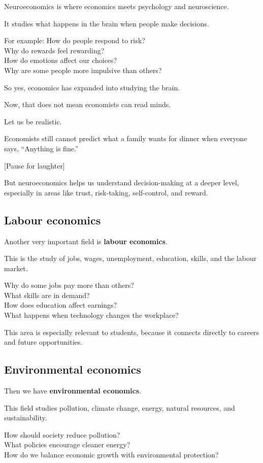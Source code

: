 \documentclass[12pt]{article}
\begin{document}
Neuroeconomics is where economics meets psychology and neuroscience.

It studies what happens in the brain when people make decisions.

For example:
How do people respond to risk?\\
Why do rewards feel rewarding?\\
How do emotions affect our choices?\\
Why are some people more impulsive than others?

So yes, economics has expanded into studying the brain.

Now, that does not mean economists can read minds.

Let us be realistic.

Economists still cannot predict what a family wants for dinner when everyone says, “Anything is fine.”

[Pause for laughter]

But neuroeconomics helps us understand decision-making at a deeper level, especially in areas like trust, risk-taking, self-control, and reward.

\subsection*{Labour economics}

Another very important field is \textbf{labour economics}.

This is the study of jobs, wages, unemployment, education, skills, and the labour market.

Why do some jobs pay more than others?\\
What skills are in demand?\\
How does education affect earnings?\\
What happens when technology changes the workplace?

This area is especially relevant to students, because it connects directly to careers and future opportunities.

\subsection*{Environmental economics}

Then we have \textbf{environmental economics}.

This field studies pollution, climate change, energy, natural resources, and sustainability.

How should society reduce pollution?\\
What policies encourage cleaner energy?\\
How do we balance economic growth with environmental protection?
\end{document}
